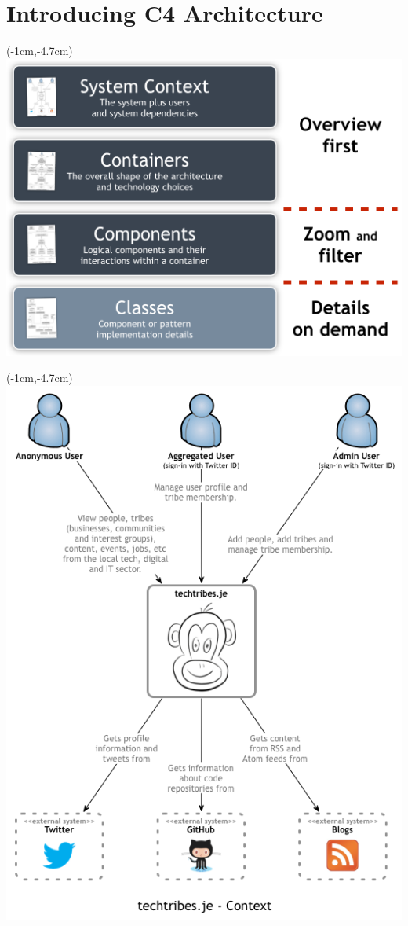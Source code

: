\documentclass[xelatex,13pt]{beamer}
\begin{document}
\section{Introducing C4 Architecture}
\begin{frame}[plain]
\begin{textblock*}{0cm}(-1cm,-4.7cm)
	\includegraphics[width=1.0\paperwidth]{c4overview.png}
\end{textblock*}
\end{frame}
\begin{frame}[plain]
\begin{textblock*}{0cm}(-1cm,-4.7cm)
	\includegraphics[width=1.0\paperwidth]{c4systemcontext.png}
\end{textblock*}
\end{frame}
\end{document}
